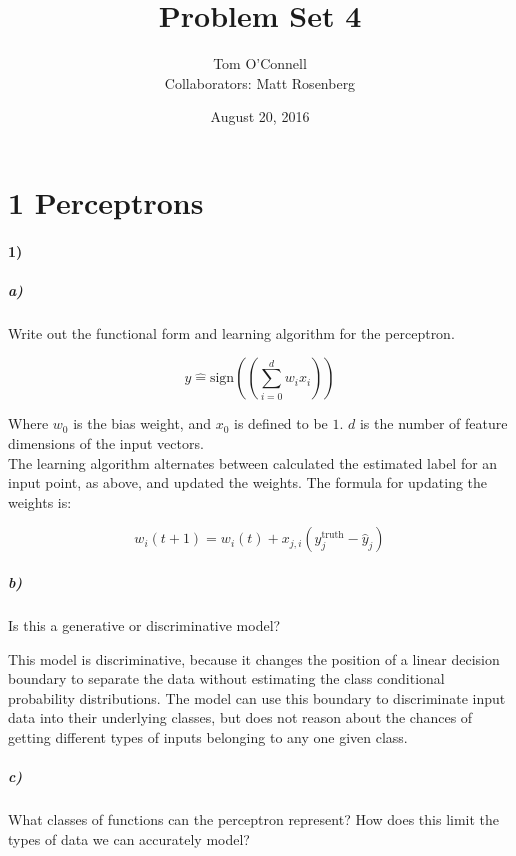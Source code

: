\documentclass[10pt,letter]{article}
\begin{document}

\title{Problem Set 4}

\author{Tom O'Connell \\ \large Collaborators: Matt Rosenberg}

\date{August 20, 2016}
 
\maketitle 


\section*{1 Perceptrons}

\paragraph{1)}

\subparagraph{a)} Write out the functional form and learning algorithm for the perceptron.

\[ y\hat = \text{sign}((\sum_{i=0}^{d}{w_ix_i}))  \]

Where $w_0$ is the bias weight, and $x_0$ is defined to be $1$. $d$ is the number of feature 
dimensions of the input vectors.\\

The learning algorithm alternates between calculated the estimated label for an input point, as 
above, and updated the weights.  The formula for updating the weights is:

\[ w_i(t + 1) = w_i(t) + x_{j,i} (y_j^\text{truth} - \hat{y}_j)  \]

\subparagraph{b)} Is this a generative or discriminative model?

This model is discriminative, because it changes the position of a linear decision boundary to 
separate the data without estimating the class conditional probability distributions. The model 
can use this boundary to discriminate input data into their underlying classes, but does not reason
 about the chances of getting different types of inputs belonging to any one given class.

\subparagraph{c)} What classes of functions can the perceptron represent? How does this limit the types of data we can accurately model? \\
\end{document}
